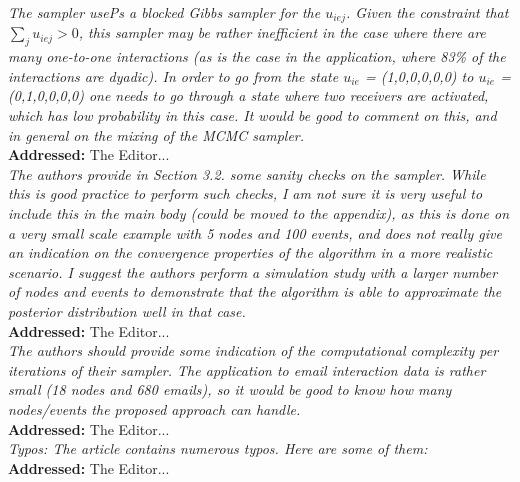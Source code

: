 \documentclass[12pt]{article}
\newcommand{\grey}[1]{{\color{mygrey}#1}}
\theoremstyle{definition}
\begin{document}
 \grey{\emph{The sampler usePs a blocked Gibbs sampler for the $u_{iej}$. Given the constraint that $\sum_j u_{iej} > 0$, this sampler may be rather inefficient in the case where there are many one-to-one interactions (as is the case in the application, where 83\% of the interactions are dyadic). In order to go from the state $u_{ie}$ = (1,0,0,0,0,0) to $u_{ie}$ = (0,1,0,0,0,0) one needs to go through a state where two receivers are activated, which has low probability in this case. It would be good to comment on this, and in general on the mixing of the MCMC sampler. }}\\

\noindent \textcolor{MyGreen}{\textbf{Addressed:}} The Editor... \\


 \grey{\emph{The authors provide in Section 3.2. some sanity checks on the sampler. While this is good practice to perform such checks, I am not sure it is very useful to include this in the main body (could be moved to the appendix), as this is done on a very small scale example with 5 nodes and 100 events, and does not really give an indication on the convergence properties of the algorithm in a more realistic scenario. I suggest the authors perform a simulation study with a larger number of nodes and events to demonstrate that the algorithm is able to approximate the posterior distribution well in that case.
}}\\

\noindent \textcolor{MyGreen}{\textbf{Addressed:}} The Editor... \\



 \grey{\emph{The authors should provide some indication of the computational complexity per iterations of their sampler. The application to email interaction data is rather small (18 nodes and 680 emails), so it would be good to know how many nodes/events the proposed approach can handle.}}\\

\noindent \textcolor{MyGreen}{\textbf{Addressed:}} The Editor... \\



 \grey{\emph{Typos: The article contains numerous typos. Here are some of them:}}\\

\noindent \textcolor{MyGreen}{\textbf{Addressed:}} The Editor... \\
\end{document}
